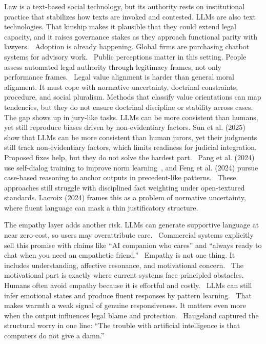{Law is a text-based social technology, but its authority rests on institutional practice that stabilizes how texts are invoked and contested. LLMs are also text technologies. That kinship makes it plausible that they could extend legal capacity, and it raises governance stakes as they approach functional parity with lawyers.~\cite{ref9} Adoption is already happening. Global firms are purchasing chatbot systems for advisory work.~\cite{ref10} Public perceptions matter in this setting. People assess automated legal authority through legitimacy frames, not only performance frames.~\cite{ref11} Legal value alignment is harder than general moral alignment. It must cope with normative uncertainty, doctrinal constraints, procedure, and social pluralism. Methods that classify value orientations can map tendencies, but they do not ensure doctrinal discipline or stability across cases.~\cite{ref12} The gap shows up in jury-like tasks. LLMs can be more consistent than humans, yet still reproduce biases driven by non-evidentiary factors. Sun et al. (2025) show that LLMs can be more consistent than human jurors, yet their judgments still track non-evidentiary factors, which limits readiness for judicial integration. Proposed fixes help, but they do not solve the hardest part.~\cite{ref13} Pang et al. (2024) use self-dialog training to improve norm learning~\cite{ref14}, and Feng et al. (2024) pursue case-based reasoning to anchor outputs in precedent-like patterns.~\cite{ref15} These approaches still struggle with disciplined fact weighting under open-textured standards. Lacroix (2024) frames this as a problem of normative uncertainty, where fluent language can mask a thin justificatory structure.~\cite{ref16}

The empathy layer adds another risk. LLMs can generate supportive language at near zero-cost, so users may overattribute care.~\cite{ref17} Commercial systems explicitly sell this promise with claims like ``AI companion who cares'' and ``always ready to chat when you need an empathetic friend.''~\cite{ref18} Empathy is not one thing. It includes understanding, affective resonance, and motivational concern.~\cite{ref19} The motivational part is exactly where current systems face principled obstacles.~\cite{ref20} Humans often avoid empathy because it is effortful and costly.~\cite{ref21} LLMs can still infer emotional states and produce fluent responses by pattern learning.~\cite{ref22} That makes warmth a weak signal of genuine responsiveness. It matters even more when the output influences legal blame and protection.~\cite{ref23} Haugeland captured the structural worry in one line: ``The trouble with artificial intelligence is that computers do not give a damn.''~\cite{ref24}

}
